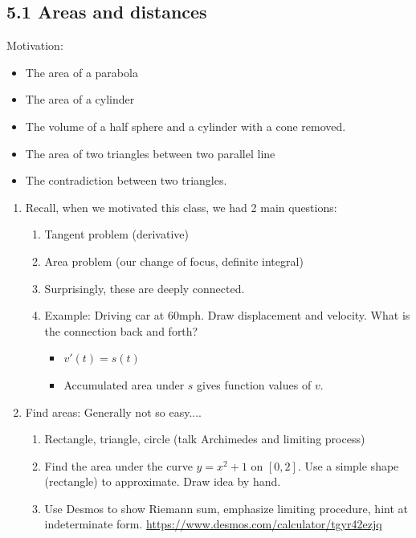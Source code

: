 \documentclass{article}
\begin{document}
\subsection{5.1 Areas and distances}
Motivation:
\begin{itemize}
\item The area of a parabola
\item The area of a cylinder
\item The volume of a half sphere and a cylinder with a cone removed.
\item The area of two triangles between two parallel line
\item The contradiction between two triangles.
\end{itemize}
\begin{enumerate}

\item Recall, when we motivated this class, we had 2 main questions:
\begin{enumerate}
\item Tangent problem (derivative)
\item Area problem (our change of focus, definite integral)
\item Surprisingly, these are deeply connected.
\item Example: Driving car at 60mph. Draw displacement and velocity. What is the connection back and forth?
\begin{itemize}
\item $v'(t) = s(t)$
\item Accumulated area under $s$ gives function values of $v$.
\end{itemize}
\end{enumerate}

\item Find areas: Generally not so easy....
\begin{enumerate}
\item Rectangle, triangle, circle (talk Archimedes and limiting process)
\item Find the area under the curve $y = x^2+1$ on $[0,2]$. Use a simple shape (rectangle) to approximate. Draw idea by hand.
\item Use Desmos to show Riemann sum, emphasize limiting procedure, hint at indeterminate form. \url{https://www.desmos.com/calculator/tgyr42ezjq}
\end{enumerate}


\end{enumerate}
\end{document}
